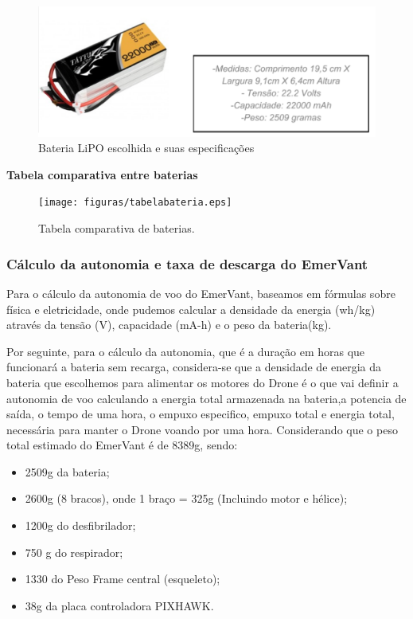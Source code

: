 \begin{figure}[H]
    \centering
	\includegraphics[keepaspectratio=true,scale=0.6]{figuras/baterialipo.eps}
    \caption{Bateria LiPO escolhida e suas especificações}
    \label{fig:baterialipo}
\end{figure}

\textbf{Tabela comparativa entre baterias}

\begin{figure}[H]
    \centering
	\texttt{[image: figuras/tabelabateria.eps]}
    \caption{Tabela comparativa de baterias.}
    \label{fig:tabelabateria}
\end{figure}


\subsubsection{Cálculo da autonomia e taxa de descarga do EmerVant}

Para o cálculo da autonomia de voo do EmerVant, baseamos em fórmulas sobre física e eletricidade, onde pudemos calcular a densidade da energia (wh/kg) através da tensão (V), capacidade (mA-h) e o peso da bateria(kg). 

Por seguinte, para o cálculo da autonomia, que é a duração em horas que funcionará a bateria sem recarga, considera-se que a densidade de energia da bateria que escolhemos para alimentar os motores do Drone é o que vai definir a autonomia de voo calculando a energia total armazenada na bateria,a potencia de saída, o tempo de uma hora, o empuxo especifico, empuxo total e energia total, necessária para manter o Drone voando por uma hora. Considerando que o peso total estimado do EmerVant é de 8389g, sendo:

\begin{itemize}
\item 2509g da bateria;
\item 2600g (8 bracos), onde 1 braço = 325g (Incluindo motor e hélice);
\item 1200g do desfibrilador;
\item 750 g do respirador;
\item 1330 do Peso Frame central (esqueleto);
\item 38g da placa controladora PIXHAWK.
\end{itemize}

